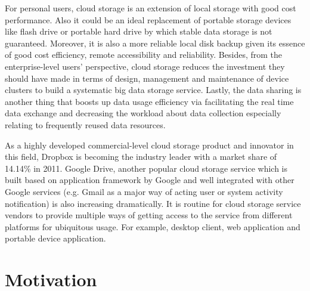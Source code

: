 For personal users, cloud storage is an extension of local storage with good cost performance. Also it could be an ideal replacement of portable storage devices like flash drive or portable hard drive by which stable data storage is not guaranteed. Moreover, it is also a more reliable local disk backup given its essence of good cost efficiency, remote accessibility and reliability. Besides, from the enterprise-level users’ perspective, cloud storage reduces the investment they should have made in terms of design, management and maintenance of device clusters to build a systematic big data storage service. Lastly, the data sharing is another thing that boosts up data usage efficiency via facilitating the real time data exchange and decreasing the workload about data collection especially relating to frequently reused data resources.

As a highly developed commercial-level cloud storage product and innovator in this field, Dropbox is becoming the industry leader with a market share of 14.14\% in 2011\cite{OPSWAT2011}. Google Drive, another popular cloud storage service which is built based on application framework by Google and well integrated with other Google services (e.g. Gmail as a major way of acting user or system activity notification) is also increasing dramatically. It is routine for cloud storage service vendors to provide multiple ways of getting access to the service from different platforms for ubiquitous usage. For example, desktop client, web application and portable device application.

\section{Motivation}


